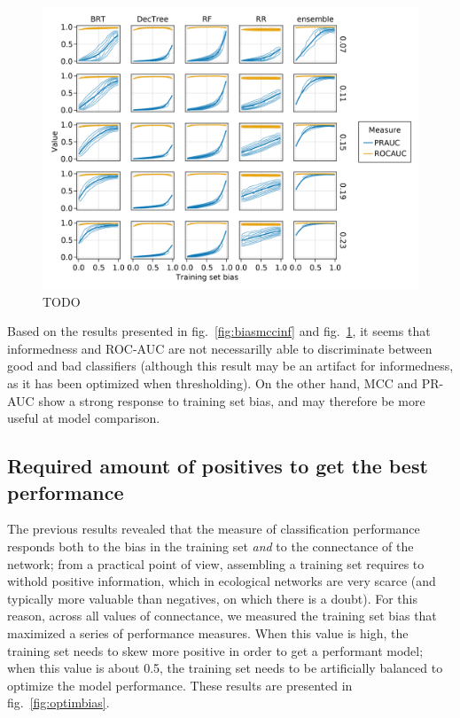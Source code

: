 \documentclass[11pt]{article}
\makeatletter
\def\maxwidth{\ifdim\Gin@nat@width>\linewidth\linewidth
\else\Gin@nat@width\fi}
\let\Oldincludegraphics\includegraphics
\renewcommand{\includegraphics}[1]{\Oldincludegraphics[width=\maxwidth]{#1}}
\makeatother
\begin{document}
\begin{figure}
\hypertarget{fig:biasrocpr}{%
\centering
\includegraphics{figures/bias_roc_pr.png}
\caption{TODO}\label{fig:biasrocpr}
}
\end{figure}

Based on the results presented in fig.~\ref{fig:biasmccinf} and
fig.~\ref{fig:biasrocpr}, it seems that informedness and ROC-AUC are not
necessarilly able to discriminate between good and bad classifiers
(although this result may be an artifact for informedness, as it has
been optimized when thresholding). On the other hand, MCC and PR-AUC
show a strong response to training set bias, and may therefore be more
useful at model comparison.

\hypertarget{required-amount-of-positives-to-get-the-best-performance}{%
\subsection{Required amount of positives to get the best
performance}\label{required-amount-of-positives-to-get-the-best-performance}}

The previous results revealed that the measure of classification
performance responds both to the bias in the training set \emph{and} to
the connectance of the network; from a practical point of view,
assembling a training set requires to withold positive information,
which in ecological networks are very scarce (and typically more
valuable than negatives, on which there is a doubt). For this reason,
across all values of connectance, we measured the training set bias that
maximized a series of performance measures. When this value is high, the
training set needs to skew more positive in order to get a performant
model; when this value is about 0.5, the training set needs to be
artificially balanced to optimize the model performance. These results
are presented in fig.~\ref{fig:optimbias}.
\end{document}
